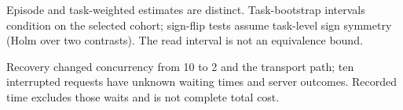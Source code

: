 Episode and task-weighted estimates are distinct. Task-bootstrap intervals condition on the selected cohort; sign-flip tests assume task-level sign symmetry (Holm over two contrasts). The read interval is not an equivalence bound.

Recovery changed concurrency from 10 to 2 and the transport path; ten interrupted requests have unknown waiting times and server outcomes. Recorded time excludes those waits and is not complete total cost.
